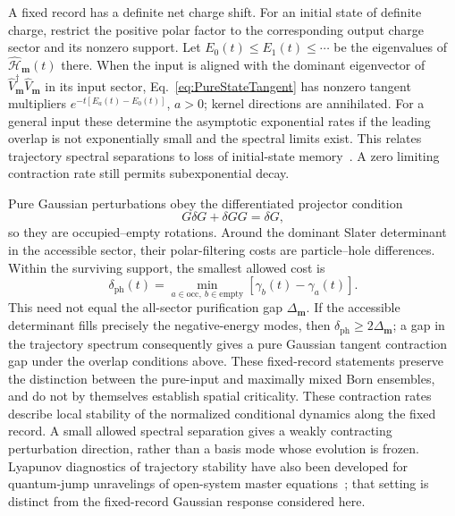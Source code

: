 \documentclass[aps,prb,10pt,twocolumn,superscriptaddress,longbibliography,floatfix]{revtex4-2}
\newcommand{\rec}{\mathbf m}   %
\begin{document}
{A fixed record has a definite net charge shift. For an initial state of definite charge, restrict the positive polar factor to the corresponding output charge sector and its nonzero support. Let $E_0(t)\leq E_1(t)\leq\cdots$ be the eigenvalues of $\hat{\mathcal H}_{\rec}(t)$ there. When the input is aligned with the dominant eigenvector of $\hat V_{\rec}^\dagger\hat V_{\rec}$ in its input sector, Eq.~\eqref{eq:PureStateTangent} has nonzero tangent multipliers $e^{-t[E_a(t)-E_0(t)]}$, $a>0$; kernel directions are annihilated. For a general input these determine the asymptotic exponential rates if the leading overlap is not exponentially small and the spectral limits exist. This relates trajectory spectral separations to loss of initial-state memory~\cite{BulchandaniSondhiChalker2024}. A zero limiting contraction rate still permits subexponential decay.

Pure Gaussian perturbations obey the differentiated projector condition
\begin{equation}
 G\delta G+\delta G G=\delta G,
 \label{eq:PureCovarianceTangent}
\end{equation}
so they are occupied--empty rotations. Around the dominant Slater determinant in the accessible sector, their polar-filtering costs are particle--hole differences. Within the surviving support, the smallest allowed cost is
\begin{equation}
 \delta_{\mathrm{ph}}(t)=
 \min_{a\in\mathrm{occ},\ b\in\mathrm{empty}}
 [\gamma_b(t)-\gamma_a(t)].
 \label{eq:ParticleHoleResponseGap}
\end{equation}
This need not equal the all-sector purification gap $\Delta_{\rec}$. If the accessible determinant fills precisely the negative-energy modes, then $\delta_{\mathrm{ph}}\geq2\Delta_{\rec}$; a gap in the trajectory spectrum consequently gives a pure Gaussian tangent contraction gap under the overlap conditions above. These fixed-record statements preserve the distinction between the pure-input and maximally mixed Born ensembles, and do not by themselves establish spatial criticality.
These contraction rates describe local stability of the normalized conditional dynamics along the fixed record. A small allowed spectral separation gives a weakly contracting perturbation direction, rather than a basis mode whose evolution is frozen.
Lyapunov diagnostics of trajectory stability have also been developed for quantum-jump unravelings of open-system master equations~\cite{Yusipov2019}; that setting is distinct from the fixed-record Gaussian response considered here.
}
\end{document}
